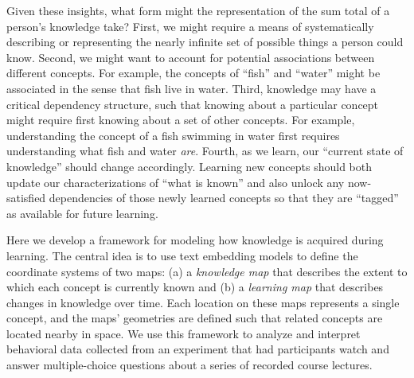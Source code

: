 \documentclass[10pt]{article}
\begin{document}
Given these insights, what form might the representation of the sum total of a
person's knowledge take? First, we might require a means of systematically
describing or representing the nearly infinite set of possible things a person
could know. Second, we might want to account for potential associations between
different concepts. For example, the concepts of ``fish'' and ``water'' might
be associated in the sense that fish live in water. Third, knowledge may have a
critical dependency structure, such that knowing about a particular concept
might require first knowing about a set of other concepts. For example,
understanding the concept of a fish swimming in water first requires
understanding what fish and water \textit{are}. Fourth, as we learn, our
``current state of knowledge'' should change accordingly. Learning new concepts
should both update our characterizations of ``what is known'' and also
unlock any now-satisfied dependencies of those newly learned concepts so that
they are ``tagged'' as available for future learning.

Here we develop a framework for modeling how knowledge is acquired during
learning. The central idea is to use text embedding models to define the
coordinate systems of two maps: (a) a \textit{knowledge map} that describes the
extent to which each concept is currently known and (b) a \textit{learning map}
that describes changes in knowledge over time. Each location on these maps
represents a single concept, and the maps' geometries are defined such that
related concepts are located nearby in space. We use this framework to analyze
and interpret behavioral data collected from an experiment that had
participants watch and answer multiple-choice questions about a series of
recorded course lectures.
\end{document}
